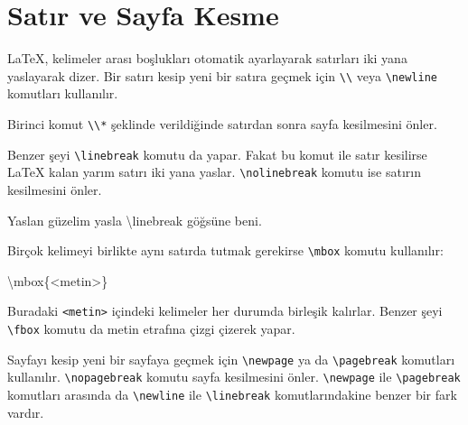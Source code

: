 \documentclass[
  10pt,
]{scrbook}
\newenvironment{Shaded}{\begin{snugshade}}{\end{snugshade}}
\newcommand{\NormalTok}[1]{#1}
\newcommand{\SpecialCharTok}[1]{\textcolor[rgb]{0.00,0.00,0.00}{#1}}
\begin{document}
\hypertarget{satux131r-ve-sayfa-kesme}{%
\section{Satır ve Sayfa Kesme}\label{satux131r-ve-sayfa-kesme}}

LaTeX, kelimeler arası boşlukları otomatik ayarlayarak satırları iki
yana yaslayarak dizer. Bir satırı kesip yeni bir satıra geçmek için \texttt{\textbackslash{}\textbackslash{}}
veya \texttt{\textbackslash{}newline} komutları kullanılır.

Birinci komut \texttt{\textbackslash{}\textbackslash{}*} şeklinde verildiğinde satırdan sonra sayfa
kesilmesini önler.

Benzer şeyi \texttt{\textbackslash{}linebreak} komutu da yapar. Fakat bu komut ile satır
kesilirse LaTeX kalan yarım satırı iki yana yaslar. \texttt{\textbackslash{}nolinebreak}
komutu ise satırın kesilmesini önler.

\begin{Shaded}
\begin{Highlighting}[]
\NormalTok{Yaslan güzelim yasla \textbackslash{}linebreak göğsüne beni.}
\end{Highlighting}
\end{Shaded}

Birçok kelimeyi birlikte aynı satırda tutmak gerekirse \texttt{\textbackslash{}mbox} komutu
kullanılır:

\begin{Shaded}
\begin{Highlighting}[]
\NormalTok{\textbackslash{}mbox\{}\SpecialCharTok{\textless{}}\NormalTok{metin}\SpecialCharTok{\textgreater{}}\NormalTok{\}}
\end{Highlighting}
\end{Shaded}

Buradaki \texttt{\textless{}metin\textgreater{}} içindeki kelimeler her durumda birleşik kalırlar.
Benzer şeyi \texttt{\textbackslash{}fbox} komutu da metin etrafına çizgi çizerek yapar.

Sayfayı kesip yeni bir sayfaya geçmek için \texttt{\textbackslash{}newpage} ya da \texttt{\textbackslash{}pagebreak}
komutları kullanılır. \texttt{\textbackslash{}nopagebreak} komutu sayfa kesilmesini önler.
\texttt{\textbackslash{}newpage} ile \texttt{\textbackslash{}pagebreak} komutları arasında da \texttt{\textbackslash{}newline} ile
\texttt{\textbackslash{}linebreak} komutlarındakine benzer bir fark vardır.

\backmatter

  

\printindex
\end{document}
